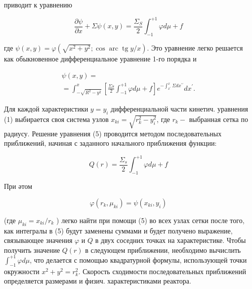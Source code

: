 \documentclass[10pt]{article}
\begin{document}
приводит к уравнению



\[

\frac{\partial \psi}{\partial x}+\Sigma \psi(x, y)=\frac{\Sigma_{S}}{2} \int_{-1}^{+1} \varphi d \mu+f

\]



где $\psi(x, y)=\varphi\left(\sqrt{x^{2}+y^{2}} ; \cos \operatorname{arc} \operatorname{tg} y / x\right)$. Это уравнение легко решается как обыкновенное дифференциальное уравнение 1-го порядка и



\[

\begin{gathered}

\psi(x, y)= \\

=\int_{-\sqrt{R^{2}-y^{2}}}^{x}\left[\frac{\Sigma s}{2} \int_{-1}^{+1} \varphi d \mu+f\right] e^{-\int_{x^{\prime}}^{x} \Sigma d x^{\prime \prime}} d x^{\prime} .

\end{gathered}

\]



Для каждой характеристики $y=y_{i}$ дифференциальной части кинетич. уравнения (1) выбирается своя система узлов $x_{k i}=\sqrt{r_{k}^{2}-y_{i}^{2}}$, где $r_{k}-$ выбранная сетка по радиусу. Решение уравнения (5) проводится методом последовательных приближений, начиная с заданного начального приближения функции:



\[

Q(r)=\frac{\Sigma_{s}}{2} \int_{-1}^{+1} \varphi d \mu+f

\]



При әтом



\[

\varphi\left(r_{k}, \mu_{k i}\right)=\psi\left(x_{k i}, y_{i}\right)

\]



(где $\mu_{k i}=x_{k i} / r_{k}$ ) легко найти при помощи (5) во всех узлах сетки после того, как интегралы в (5) будут заменены суммами и будет получено выражение, связывающее значения $\varphi$ и $Q$ в двух соседних точках на характеристике. Чтобы получить значение $Q(r)$ в следующем приближении, необходимо вычислить $\int_{-1}^{+1} \varphi d \mu$, что делается с помощью квадратурной формулы, использующей точки окружности $x^{2}+y^{2}=r_{k}^{2}$. Скорость сходимости последовательных приближений определяется размерами и физич. характеристиками реактора.
\end{document}
